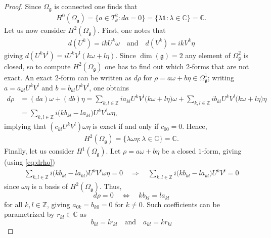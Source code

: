 \documentclass{amsart}
\newcommand{\complex}{\mathbb{C}}
\newcommand{\integers}{\mathbb{Z}}
\newcommand{\paraa}[1]{\big(#1\big)}
\newcommand{\spacearound}[1]{\quad#1\quad}
\newcommand{\equivalent}{\spacearound{\Leftrightarrow}}
\renewcommand{\implies}{\spacearound{\Rightarrow}}
\theoremstyle{definition}
\theoremstyle{remark}
\numberwithin{equation}{section}
\renewcommand{\mid}{\mathds{1}}
\newcommand{\qand}{\quad\text{and}\quad}
\newcommand{\g}{\mathfrak{g}}
\newcommand{\Omegag}[1]{\Omega^{#1}_{\g}}
\newcommand{\Ttwotheta}{T^2_{\theta}}
\begin{document}
\begin{proof}
  Since $\Omegag{}$ is connected one finds that
  \begin{align*}
    H^0(\Omegag{}) = \{a\in\Ttwotheta: da = 0\} = \{\lambda\mid:\lambda\in\complex\}=\complex.
  \end{align*}
  Let us now consider $H^2(\Omegag{})$. First, one notes that
  \begin{align*}
    d(U^k) = ikU^k\omega\qand
    d(V^k) = ikV^k\eta
  \end{align*}
  giving $d(U^kV^l)=iU^kV^l(k\omega + l\eta)$.  Since $\dim(\g)=2$
  any element of $\Omegag{2}$ is closed, so to compute
  $H^2(\Omegag{})$ one has to find out which 2-forms that are not
  exact. An exact 2-form can be written as $d\rho$ for
  $\rho = a\omega + b\eta\in\Omegag{1}$; writing $a=a_{kl}U^kV^l$ and
  $b=b_{kl}U^kV^l$, one obtains 
  \begin{equation}\label{eq:drho}
    \begin{split}      
    d\rho &= (da)\omega + (db)\eta =
    \sum_{k,l\in\integers}ia_{kl}U^kV^l\paraa{k\omega + l\eta}\omega
    +\sum_{k,l\in\integers}ib_{kl}U^kV^l\paraa{k\omega + l\eta}\eta\\
    &=
    \sum_{k,l\in\integers}i\paraa{kb_{kl}-la_{kl}}U^kV^l\omega\eta,
    \end{split}
  \end{equation}
  implying that $(c_{kl}U^kV^l)\omega\eta$ is exact if and only if
  $c_{00}=0$. Hence,
  \begin{align*}
    H^2(\Omegag{}) = \{\lambda\omega\eta : \lambda\in\complex\} = \complex.
  \end{align*}
  Finally, let us consider $H^1(\Omegag{})$. Let
  $\rho=a\omega + b\eta$ be a closed $1$-form, giving (using \eqref{eq:drho})
  \begin{align*}
    \sum_{k,l\in\integers}i\paraa{kb_{kl}-la_{kl}}U^kV^l\omega\eta = 0\implies
    \sum_{k,l\in\integers}i\paraa{kb_{kl}-la_{kl}}U^kV^l = 0
  \end{align*}
  since $\omega\eta$ is a basis of $H^2(\Omegag{})$. Thus, 
  \begin{equation}\label{eq:drhoab}
    d\rho = 0\equivalent kb_{kl} = la_{kl}
  \end{equation}
  for all $k,l\in\integers$, giving $a_{0k}=b_{k0}=0$ for $k\neq
  0$. Such coefficients can be parametrized by $r_{kl}\in\complex$ as
  \begin{equation}\label{aklbklr}
    b_{kl} = lr_{kl}\qand
    a_{kl} = kr_{kl}
  \end{equation}

\end{proof}
\end{document}
